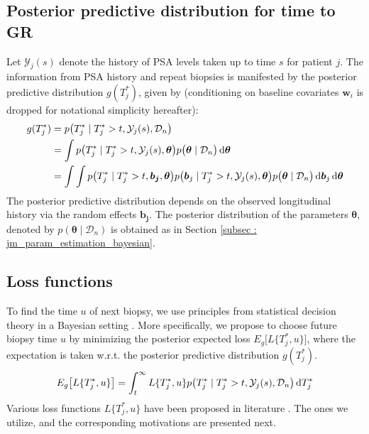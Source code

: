 \subsection{Posterior predictive distribution for time to GR}
\label{subsec : ppd_time_to_GR}
Let $\mathcal{Y}_j(s)$ denote the history of PSA levels taken up to time $s$ for patient $j$. The information from PSA history and repeat biopsies is manifested by the posterior predictive distribution $g(T^*_j)$, given by (conditioning on baseline covariates $\boldsymbol{w}_i$ is dropped for notational simplicity hereafter):
\begin{equation}
\label{eq : dyn_dist_fail_time}
\begin{split}
g(T^*_j) &= p\big(T^*_j \mid T^*_j > t, \mathcal{Y}_j(s), \mathcal{D}_n\big)\\
&= \int p\big(T^*_j \mid T^*_j > t, \mathcal{Y}_j(s), \boldsymbol{\theta}\big) p\big(\boldsymbol{\theta} \mid \mathcal{D}_n\big) \mathop{}\!\mathrm{d} \boldsymbol{\theta}\\
&= \int \int p\big(T^*_j \mid T^*_j > t, \boldsymbol{b_j}, \boldsymbol{\theta}\big) p\big(\boldsymbol{b}_j \mid T^*_j>t, \mathcal{Y}_j(s), \boldsymbol{\theta}\big)p\big(\boldsymbol{\theta} \mid \mathcal{D}_n\big) \mathop{}\!\mathrm{d} \boldsymbol{b}_j \mathop{}\!\mathrm{d} \boldsymbol{\theta}
\end{split}
\end{equation}
The posterior predictive distribution depends on the observed longitudinal history via the random effects $\boldsymbol{b_j}$. The posterior distribution of the parameters $\boldsymbol{\theta}$, denoted by $p(\boldsymbol{\theta} \mid \mathcal{D}_n)$ is obtained as in Section \ref{subsec : jm_param_estimation_bayesian}.

\subsection{Loss functions}
\label{subsec : loss_functions}
To find the time $u$ of next biopsy, we use principles from statistical decision theory in a Bayesian setting \citep{bergerDecisionTheory,robertBayesianChoice}. More specifically, we propose to choose future biopsy time $u$ by minimizing the posterior expected loss $E_g\big[L\{T^*_j, u\}\big]$, where the expectation is taken w.r.t. the posterior predictive distribution $g(T^*_j)$. 
\begin{equation*}
E_g\big[L\{T^*_j, u\}\big] = \int_t^\infty L\{T^*_j, u\} p\big(T^*_j \mid T^*_j > t, \mathcal{Y}_j(s), \mathcal{D}_n\big) \mathop{}\!\mathrm{d} T^*_j
\end{equation*}
Various loss functions $L\{T^*_j, u\}$ have been proposed in literature \citep{robertBayesianChoice}. The ones we utilize, and the corresponding motivations are presented next.

